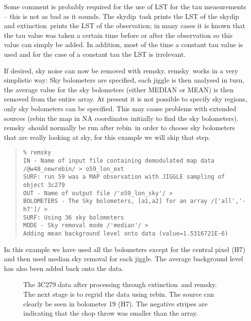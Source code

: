 \documentclass[twoside,11pt]{article}
\newcommand{\task}[1]{{\sf #1}}
\newcommand{\rebin}{\htmlref{\task{rebin}}{REBIN}}
\newcommand{\skydip}{\htmlref{\task{skydip}}{SKYDIP}}
\newcommand{\ext}{\htmlref{\task{extinction}}{EXTINCTION}}
\newcommand{\remsky}{\htmlref{\task{remsky}}{REMSKY}}
\newenvironment{myquote}{\begin{quote}\begin{small}}{\end{small}\end{quote}}
\newcommand{\htmlref}[2]{#1}
\newcommand{\htmlimage}[1]{}
\begin{document}
Some comment is probably required for the use of LST for the tau measurements
-- this is not as bad as it sounds. The \skydip\ task prints the LST of the
skydip and \ext\ prints the LST of the observation; in many cases it is known
that the tau value was taken a certain time before or after the observation so
this value can simply be added. In addition, most of the time a constant tau
value is used and for the case of a constant tau the LST is irrelevant.


If desired, sky noise can now be removed with \remsky. \remsky\ works in a very
simplistic way: Sky bolometers are specified, each jiggle is then analysed in
turn, the average value for the sky bolometers (either MEDIAN or MEAN) is then
removed from the entire array. At present it is not possible to specify sky
regions, only sky bolometers can be specified. This may cause problems with
extended sources (rebin the map in NA coordinates initially to find the sky
bolometers). \remsky\ should normally be run after \rebin\ in order to
choose sky bolometers that are really looking at sky, for this example
we will skip that step. 

\begin{myquote}
\begin{verbatim}
% remsky
IN - Name of input file containing demodulated map data /@w48_newrebin/ > o59_lon_ext
SURF: run 59 was a MAP observation with JIGGLE sampling of object 3c279
OUT - Name of output file /'o59_lon_sky'/ > 
BOLOMETERS - The Sky bolometers, [a1,a2] for an array /['all','-h7']/ > 
SURF: Using 36 sky bolometers
MODE - Sky removal mode /'median'/ > 
Adding mean background level onto data (value=1.5316721E-6)
\end{verbatim}
\end{myquote}

In this example we have used all the bolometers except for the central pixel
(H7) and then used median sky removal for each jiggle. The average background
level has also been added back onto the data.

\begin{figure}
\begin{center}
\htmlimage{scale=0.9}
\caption{The 3C279 data after processing through \ext\ and \remsky. The next
stage is to regrid the data using \rebin. The source can clearly be seen 
in bolometer 19 (H7). The negative stripes are indicating that the chop
throw was smaller than the array.}
\label{remsky}
\end{center}
\end{figure}
\end{document}
